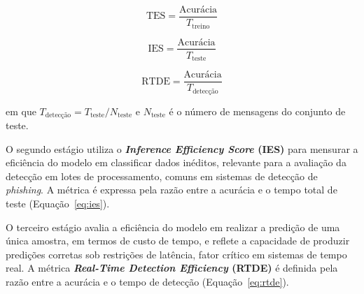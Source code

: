 \documentclass[12pt]{article}
\begin{document}
\par\medskip
\noindent
\begin{minipage}{\linewidth}
    \begin{minipage}{.31\linewidth}
        \begin{equation}
            \mathrm{TES} = \frac{\text{Acurácia}}{T_{\text{treino}}}
            \label{eq:tes}
        \end{equation}
    \end{minipage}\hfill
    \begin{minipage}{.31\linewidth}
        \begin{equation}
            \mathrm{IES} = \frac{\text{Acurácia}}{T_{\text{teste}}}
            \label{eq:ies}
        \end{equation}
    \end{minipage}\hfill
    \begin{minipage}{.31\linewidth}
        \begin{equation}
            \mathrm{RTDE} = \frac{\text{Acurácia}}{T_{\text{detecção}}}
            \label{eq:rtde}
        \end{equation}
    \end{minipage}

    \medskip
    {\small \noindent em que $T_{\text{detecção}} = T_{\text{teste}}/N_{\text{teste}}$ e
    $N_{\text{teste}}$ é o número de mensagens do conjunto de teste.\par}
\end{minipage}
\par\medskip


         O segundo estágio utiliza o \textbf{\textit{Inference Efficiency Score} (IES)} para mensurar a eficiência do modelo em classificar dados inéditos,  relevante para a avaliação da detecção em lotes de processamento, comuns em sistemas de detecção de \textit{phishing}. A métrica é expressa pela razão entre a acurácia e o tempo total de teste (Equação~\ref{eq:ies}). 
   
         O terceiro estágio avalia a eficiência do modelo em realizar a predição de uma única amostra, em termos de custo de tempo, e reflete a capacidade de produzir predições corretas sob restrições de latência, fator crítico em sistemas de tempo real. A métrica \textbf{\textit{Real-Time Detection Efficiency} (RTDE)} é definida pela razão entre a acurácia e o tempo de detecção (Equação~\ref{eq:rtde}).
\end{document}
